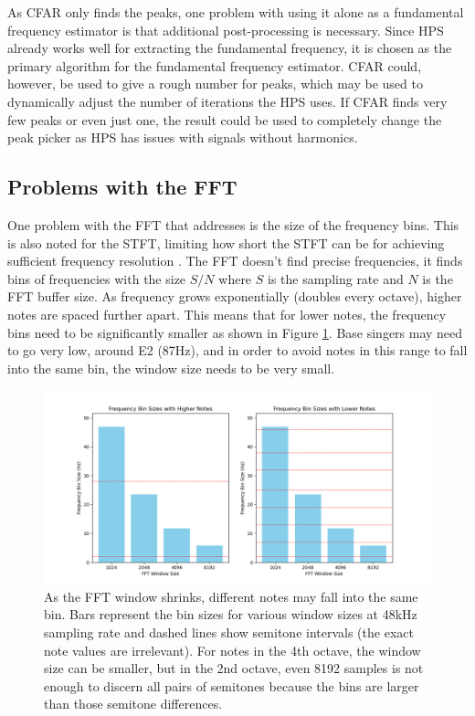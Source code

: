As CFAR only finds the peaks, one problem with using it alone as a fundamental frequency estimator is that additional post-processing is necessary. Since HPS already works well for extracting the fundamental frequency, it is chosen as the primary algorithm for the fundamental frequency estimator. CFAR could, however, be used to give a rough number for peaks, which may be used to dynamically adjust the number of iterations the HPS uses. If CFAR finds very few peaks or even just one, the result could be used to completely change the peak picker as HPS has issues with signals without harmonics.

\subsection{Problems with the FFT}
One problem with the FFT that \cite{Gotsopoulos} addresses is the size of the frequency bins. This is also noted for the STFT, limiting how short the STFT can be for achieving sufficient frequency resolution \cite{Evans2012}. The FFT doesn't find precise frequencies, it finds bins of frequencies with the size $S/N$ where $S$ is the sampling rate and $N$ is the FFT buffer size. As frequency grows exponentially (doubles every octave), higher notes are spaced further apart. This means that for lower notes, the frequency bins need to be significantly smaller as shown in Figure \ref{fig:fftBinSizeChart}. Base singers may need to go very low, around E2 (87Hz), and in order to avoid notes in this range to fall into the same bin, the window size needs to be very small.  

\begin{figure}[ht]
    \centering
    \includegraphics[width=\textwidth]{./images/fft_bin_size_chart.png}
    \caption{As the FFT window shrinks, different notes may fall into the same bin. Bars represent the bin sizes for various window sizes at 48kHz sampling rate and dashed lines show semitone intervals (the exact note values are irrelevant). For notes in the 4th octave, the window size can be smaller, but in the 2nd octave, even 8192 samples is not enough to discern all pairs of semitones because the bins are larger than those semitone differences.\label{fig:fftBinSizeChart}}
\end{figure}

